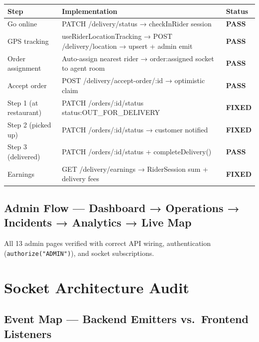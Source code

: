 \documentclass[11pt,a4paper]{article}
\newcommand{\PASS}{\colorbox{successgreen!20}{\color{successgreen}\bfseries\small PASS}}
\newcommand{\FIXED}{\colorbox{successgreen!20}{\color{successgreen}\bfseries\small FIXED}}
\begin{document}
\begin{center}
\begin{tabularx}{0.9\textwidth}{@{}lXl@{}}
\toprule
\rowcolor{navyblue}\color{white}\bfseries Step & \color{white}\bfseries Implementation & \color{white}\bfseries Status \\
\midrule
Go online            & PATCH /delivery/status → checkInRider session & \PASS \\
\rowcolor{rowalt}
GPS tracking         & useRiderLocationTracking → POST /delivery/location → upsert + admin emit & \PASS \\
Order assignment     & Auto-assign nearest rider → order:assigned socket to agent room & \PASS \\
\rowcolor{rowalt}
Accept order         & POST /delivery/accept-order/:id → optimistic claim & \PASS \\
Step 1 (at restaurant) & PATCH /orders/:id/status {status:OUT\_FOR\_DELIVERY} & \FIXED \\
\rowcolor{rowalt}
Step 2 (picked up)   & PATCH /orders/:id/status → customer notified & \FIXED \\
Step 3 (delivered)   & PATCH /orders/:id/status + completeDelivery() & \PASS \\
\rowcolor{rowalt}
Earnings             & GET /delivery/earnings → RiderSession sum + delivery fees & \FIXED \\
\bottomrule
\end{tabularx}
\end{center}

\subsection{Admin Flow — Dashboard → Operations → Incidents → Analytics → Live Map}

All 13 admin pages verified with correct API wiring, authentication
(\texttt{authorize("ADMIN")}), and socket subscriptions.

\section{Socket Architecture Audit}

\subsection{Event Map — Backend Emitters vs.\ Frontend Listeners}
\end{document}
